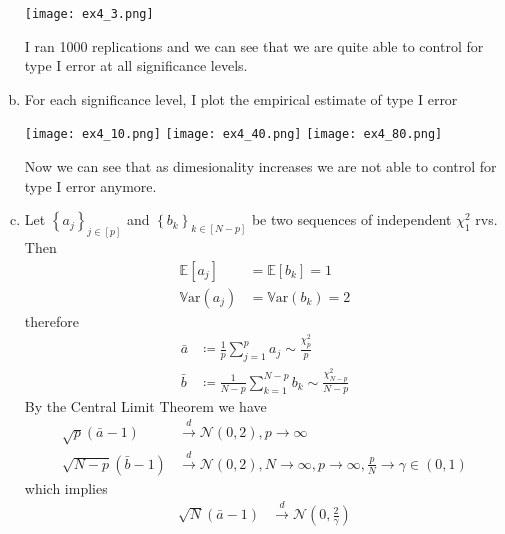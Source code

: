 \documentclass[10pt,notitlepage]{article}
\newcommand{\mean}[1]{\mathbb{E}\left[#1\right]}
\newcommand{\var}[1]{\mathbb{V}\text{ar}\left(#1\right)}
\begin{document}
\begin{exercise}[Solution]
\begin{enumerate}[(a)]
\begin{center}
                        \texttt{[image: ex4\_3.png]}
                    \end{center}
                    I ran 1000 replications and we can see that we are quite able to control for type I error at all significance levels.
            \item For each significance level, I plot the empirical estimate of type I error
                    \begin{center}
                        \texttt{[image: ex4\_10.png]}
                        \texttt{[image: ex4\_40.png]}
                        \texttt{[image: ex4\_80.png]}
                    \end{center}
                    Now we can see that as dimesionality increases we are not able to control for type I error anymore.
            \item Let $\left\{a_j\right\}_{j\in\left[p\right]}$ and $\left\{b_k\right\}_{k\in\left[N-p\right]}$ be two sequences of independent $\chi_1^2$ rvs. Then
                    \begin{align*}
                        \mean{a_j} &= \mean{b_k} = 1\\
                        \var{a_j} &= \var{b_k} = 2
                    \end{align*}
                    therefore
                    \begin{align*}
                        \bar{a}&\coloneq\frac{1}{p}\sum_{j=1}^{p}a_j\sim\frac{\chi_p^2}{p}\\
                        \bar{b}&\coloneq\frac{1}{N-p}\sum_{k=1}^{N-p}b_k\sim\frac{\chi_{N-p}^2}{N-p}
                    \end{align*}
                    By the Central Limit Theorem we have 
                    \begin{align*}
                        \sqrt{p}(\bar{a}-1)&\overset{d}{\longrightarrow}\mathcal{N}(0,2), p\rightarrow\infty\\
                        \sqrt{N-p}(\bar{b}-1)&\overset{d}{\longrightarrow}\mathcal{N}(0,2), N\rightarrow\infty, p\rightarrow\infty, \frac{p}{N}\longrightarrow\gamma\in(0,1)
                    \end{align*}
                    which implies
                    \begin{align*}
                        \sqrt{N}(\bar{a}-1)&\overset{d}{\longrightarrow}\mathcal{N}\left(0,\frac{2}{\gamma}\right)\\

\end{align*}
\end{enumerate}
\end{exercise}
\end{document}
